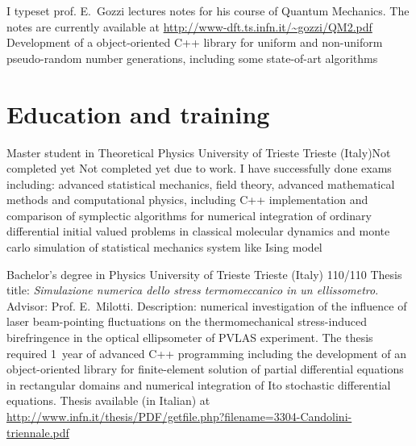 \documentclass[10pt,a4paper]{moderncv}   %
\begin{document}
{   I typeset prof. E.~Gozzi lectures notes for his course of Quantum Mechanics.
   The notes are currently available at 
   \url{http://www-dft.ts.infn.it/~gozzi/QM2.pdf}}
{}{Development of a object-oriented C++ library for uniform and non-uniform
   pseudo-random number generations, including some state-of-art algorithms}

\section{Education and training}
%
{Master student in Theoretical Physics}
{University of Trieste}
{Trieste (Italy)}{Not completed yet}
{Not completed yet due to work. I have successfully done  exams including: advanced statistical mechanics,
   field theory, advanced mathematical methods and computational physics,
   including C++
   implementation and comparison of symplectic algorithms for numerical
   integration of ordinary differential initial valued problems in classical
   molecular dynamics and monte carlo simulation of statistical mechanics
   system like Ising model}

{Bachelor's degree in Physics}
{University of Trieste}
{Trieste (Italy)}
{110/110}
{Thesis title: \emph{Simulazione numerica dello stress termomeccanico in un
      ellissometro}.
   Advisor: Prof. E.~Milotti.
   Description:
numerical investigation of the influence of laser beam-pointing fluctuations 
on the
   thermomechanical stress-induced birefringence in the optical
   ellipsometer of PVLAS experiment. The thesis required 1~year of advanced C++ programming
   including the development of an object-oriented library for finite-element
   solution of partial differential equations 
   in rectangular domains and numerical integration of Ito stochastic differential
   equations.
Thesis available (in Italian) at 
\url{http://www.infn.it/thesis/PDF/getfile.php?filename=3304-Candolini-triennale.pdf}
}
    
\end{document}
